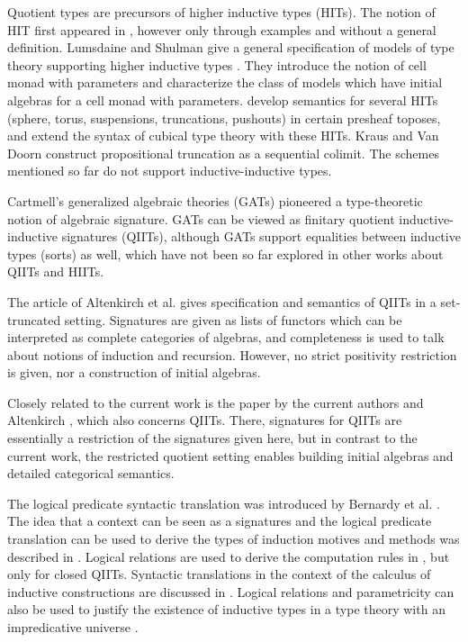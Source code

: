 \documentclass[dvipsnames]{lmcs} %
\newcommand{\1}{\mathsf{1}} \renewcommand{\Pr}{\mathsf{Pr}}
\theoremstyle{plain}\newtheorem{satz}[thm]{Satz} %
\begin{document}
Quotient types \cite{hofmann95extensional} are precursors of higher inductive
types (HITs). The notion of HIT first appeared in \cite{HoTTbook}, however only
through examples and without a general definition.  Lumsdaine and Shulman give a
general specification of models of type theory supporting higher inductive types
\cite{lumsdaineShulman}. They introduce the notion of cell monad with parameters
and characterize the class of models which have initial algebras for a cell
monad with parameters. \cite{cubicalhits} develop semantics for several HITs
(sphere, torus, suspensions, truncations, pushouts) in certain presheaf toposes,
and extend the syntax of cubical type theory \cite{ctt} with these HITs. Kraus
\cite{krausprop} and Van Doorn \cite{doorn} construct propositional truncation
as a sequential colimit. The schemes mentioned so far do not support
inductive-inductive types.

Cartmell's generalized algebraic theories (GATs) \cite{gat} pioneered a
type-theoretic notion of algebraic signature. GATs can be viewed as finitary
quotient inductive-inductive signatures (QIITs), although GATs support equalities
between inductive types (sorts) as well, which have not been so far explored in
other works about QIITs and HIITs.

The article of Altenkirch et al. \cite{gabe} gives specification and semantics
of QIITs in a set-truncated setting. Signatures are given as lists of functors
which can be interpreted as complete categories of algebras, and completeness is
used to talk about notions of induction and recursion.  However, no strict
positivity restriction is given, nor a construction of initial algebras.

Closely related to the current work is the paper by the current authors and
Altenkirch \cite{kaposi2019constructing}, which also concerns QIITs. There,
signatures for QIITs are essentially a restriction of the signatures given here,
but in contrast to the current work, the restricted quotient setting enables
building initial algebras and detailed categorical semantics.

The logical predicate syntactic translation was introduced by Bernardy et
al. \cite{bernardy2010parametricity}. The idea that a context can be seen as a
signatures and the logical predicate translation can be used to derive the types
of induction motives and methods was described in \cite[Section
  5.3]{ttintt}. Logical relations are used to derive the computation rules in
\cite[Section 4.3]{kaposi-phd}, but only for closed QIITs. Syntactic
translations in the context of the calculus of inductive constructions are
discussed in \cite{next700}. Logical relations and parametricity can also be
used to justify the existence of inductive types in a type theory with an
impredicative universe \cite{atkey}.
\end{document}
